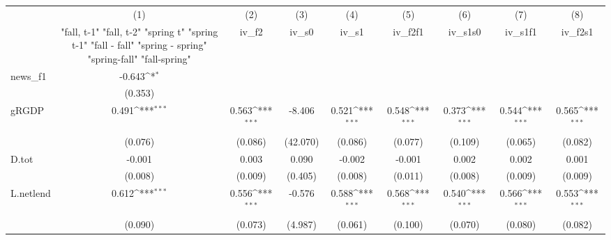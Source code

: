 {
\def\sym#1{\ifmmode^{#1}\else\(^{#1}\)\fi}
\begin{tabular}{l*{8}{c}}
\toprule
            &\multicolumn{1}{c}{(1)}&\multicolumn{1}{c}{(2)}&\multicolumn{1}{c}{(3)}&\multicolumn{1}{c}{(4)}&\multicolumn{1}{c}{(5)}&\multicolumn{1}{c}{(6)}&\multicolumn{1}{c}{(7)}&\multicolumn{1}{c}{(8)}\\
            &\multicolumn{1}{c}{  "fall, t-1" "fall, t-2" "spring t" "spring t-1"  "fall - fall" "spring - spring" "spring-fall" "fall-spring" }&\multicolumn{1}{c}{iv\_f2}&\multicolumn{1}{c}{iv\_s0}&\multicolumn{1}{c}{iv\_s1}&\multicolumn{1}{c}{iv\_f2f1}&\multicolumn{1}{c}{iv\_s1s0}&\multicolumn{1}{c}{iv\_s1f1}&\multicolumn{1}{c}{iv\_f2s1}\\
\midrule
news\_f1     &      -0.643\sym{*}  &                     &                     &                     &                     &                     &                     &                     \\
            &     (0.353)         &                     &                     &                     &                     &                     &                     &                     \\
\addlinespace
gRGDP       &       0.491\sym{***}&       0.563\sym{***}&      -8.406         &       0.521\sym{***}&       0.548\sym{***}&       0.373\sym{***}&       0.544\sym{***}&       0.565\sym{***}\\
            &     (0.076)         &     (0.086)         &    (42.070)         &     (0.086)         &     (0.077)         &     (0.109)         &     (0.065)         &     (0.082)         \\
\addlinespace
D.tot       &      -0.001         &       0.003         &       0.090         &      -0.002         &      -0.001         &       0.002         &       0.002         &       0.001         \\
            &     (0.008)         &     (0.009)         &     (0.405)         &     (0.008)         &     (0.011)         &     (0.008)         &     (0.009)         &     (0.009)         \\
\addlinespace
L.netlend   &       0.612\sym{***}&       0.556\sym{***}&      -0.576         &       0.588\sym{***}&       0.568\sym{***}&       0.540\sym{***}&       0.566\sym{***}&       0.553\sym{***}\\
            &     (0.090)         &     (0.073)         &     (4.987)         &     (0.061)         &     (0.100)         &     (0.070)         &     (0.080)         &     (0.082)         \\

\end{tabular}}
